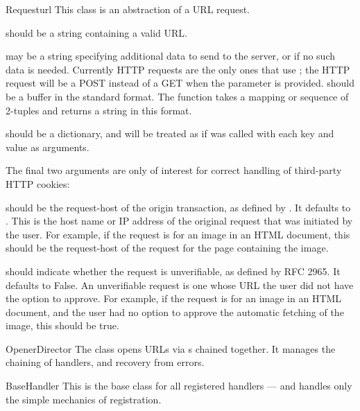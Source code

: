 \begin{classdesc}{Request}{url
    }
This class is an abstraction of a URL request.

 should be a string containing a valid URL.  

 may be a string specifying additional data to send to the
server, or  if no such data is needed. 
Currently HTTP requests are the only ones that use ;
the HTTP request will be a POST instead of a GET when the 
parameter is provided.   should be a buffer in the standard
 format.  The
 function takes a mapping or sequence of
2-tuples and returns a string in this format.

 should be a dictionary, and will be treated as if
 was called with each key and value as arguments.

The final two arguments are only of interest for correct handling of
third-party HTTP cookies:

 should be the request-host of the origin
transaction, as defined by .  It defaults to
.  This is the host name or IP
address of the original request that was initiated by the user.  For
example, if the request is for an image in an HTML document, this
should be the request-host of the request for the page containing the
image.

 should indicate whether the request is
unverifiable, as defined by RFC 2965.  It defaults to False.  An
unverifiable request is one whose URL the user did not have the option
to approve.  For example, if the request is for an image in an HTML
document, and the user had no option to approve the automatic fetching
of the image, this should be true.
\end{classdesc}

\begin{classdesc}{OpenerDirector}{}
The  class opens URLs via s
chained together. It manages the chaining of handlers, and recovery
from errors.
\end{classdesc}

\begin{classdesc}{BaseHandler}{}
This is the base class for all registered handlers --- and handles only
the simple mechanics of registration.
\end{classdesc}

